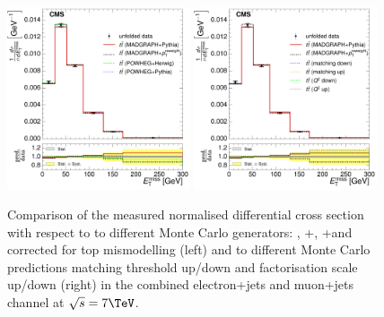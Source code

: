 \begin{figure}[hbtp]
    \centering
     \includegraphics[width=0.48\textwidth]{Chapters/04_Analysis/04b_XSections/images/results/7TeV/MET/central/normalised_xsection_combined_different_generators.pdf}\hfill
     \includegraphics[width=0.48\textwidth]{Chapters/04_Analysis/04b_XSections/images/results/7TeV/MET/central/normalised_xsection_combined_systematics_shifts.pdf}\hfill
     \caption{Comparison of the measured normalised differential cross section with respect to \met to
     different Monte Carlo generators: \MADGRAPH, \POWHEG+\HERWIG, \POWHEG+\PYTHIA and \MADGRAPH corrected for
     top \pt mismodelling (left) and to different Monte Carlo predictions matching threshold up/down and
     factorisation scale up/down (right) in the combined electron+jets and muon+jets channel at
     $\sqrt{s}=7\TeV$.}
     \label{fig:result_MET_7TeV_combined}
\end{figure}

